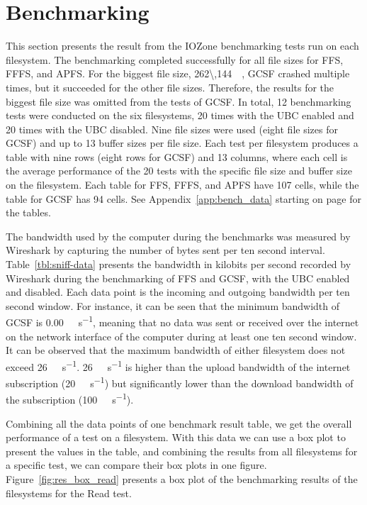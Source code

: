 \section{Benchmarking}
\label{sec:res_bench}
This section presents the result from the IOZone benchmarking tests run on each filesystem. The benchmarking completed successfully for all file sizes for \gls{FFS}, \gls{FFFS}, and \gls{APFS}. For the biggest file size, \SI{262\,144}{\kilo\byte}, \gls{GCSF} crashed multiple times, but it succeeded for the other file sizes. Therefore, the results for the biggest file size was omitted from the tests of \gls{GCSF}. In total, 12 benchmarking tests were conducted on the six filesystems, 20 times with the \gls{UBC} enabled and 20 times with the \gls{UBC} disabled. Nine file sizes were used (eight file sizes for \gls{GCSF}) and up to 13 buffer sizes per file size. Each test per filesystem produces a table with nine rows (eight rows for \gls{GCSF}) and 13 columns, where each cell is the average performance of the 20 tests with the specific file size and buffer size on the filesystem. Each table for \gls{FFS}, \gls{FFFS}, and \gls{APFS} have 107 cells, while the table for \gls{GCSF} has 94 cells. See Appendix~\ref{app:bench_data} starting on page \pageref{app:bench_data} for the tables.

The bandwidth used by the computer during the benchmarks was measured by Wireshark by capturing the number of bytes sent per ten second interval. Table~\ref{tbl:sniff-data} presents the bandwidth in kilobits per second recorded by Wireshark during the benchmarking of \gls{FFS} and \gls{GCSF}, with the \gls{UBC} enabled and disabled. Each data point is the incoming and outgoing bandwidth per ten second window. For instance, it can be seen that the minimum bandwidth of \gls{GCSF} is \SI[per-mode = symbol]{0.00}{\kilo\byte\per\second}, meaning that no data was sent or received over the internet on the network interface of the computer during at least one ten second window. It can be observed that the maximum bandwidth of either filesystem does not exceed \SI[per-mode = symbol]{26}{\mega\bit\per\second}. \SI[per-mode = symbol]{26}{\mega\bit\per\second} is higher than the upload bandwidth of the internet subscription (\SI[per-mode = symbol]{20}{\mega\bit\per\second}) but significantly lower than the download bandwidth of the subscription (\SI[per-mode = symbol]{100}{\mega\bit\per\second}).



Combining all the data points of one benchmark result table, we get the overall performance of a test on a filesystem. With this data we can use a box plot to present the values in the table, and combining the results from all filesystems for a specific test, we can compare their box plots in one figure. Figure~\ref{fig:res_box_read} presents a box plot of the benchmarking results of the filesystems for the Read test. 


